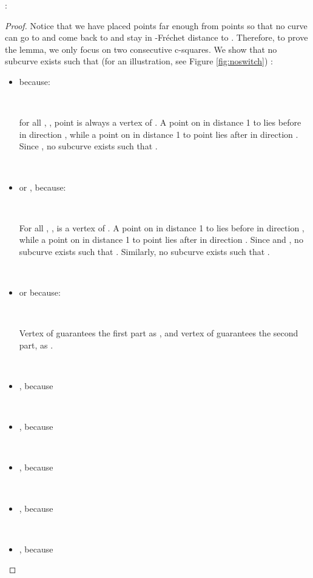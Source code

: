 \documentclass[a4paper,UKenglish]{lipics}
\newcommand{\Frechet}{Fr\'echet }
\begin{document}
:
\begin{proof}
Notice that we have placed  points far enough from 
 points so that 
no curve can go to 
and come back to  and stay 
in -\Frechet distance to .
Therefore, to prove the lemma, 
we only focus on two consecutive c-squares.
We show that no subcurve  exists such 
that (for an illustration, see Figure \ref{fig:noswitch}) :


\begin{itemize}

\item  because:

\

for all , , point  is always a vertex of . 
A point on  in distance 1 
to  lies before  
in direction , 
while a point on  in distance 1 
to point  lies after  in direction .
Since , 
no subcurve  exists such that 
.


\

\item  or , because:

\

For all , , 
is a vertex of . 
A point on  in distance 1 
to  lies before  
in direction , 
while a point on  in distance 1 
to point  lies after  in direction .
Since  and 
,
no subcurve  exists such that 
.
Similarly,  no subcurve  exists such that 
.

\

\item  or   because:

\

Vertex  of 
guarantees the first part as , 
and vertex  of 
guarantees the second part, 
as .

\

\item ,  because 

\

\item , because  

\

\item  , because  

\

\item  , because  

\

\item  , because  
\end{itemize}

\end{proof}
\end{document}
